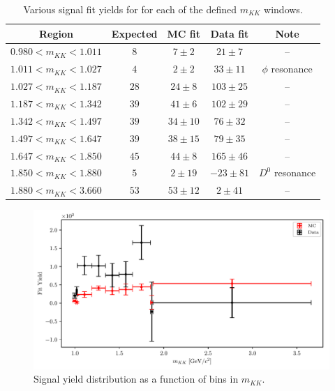 \begin{table}[H]
	\centering
	\begin{tabular}{c|c|c|c|c}
		Region & Expected & MC fit & Data fit & Note \\
		\toprule
		$0.980  < m_{KK} < 1.011$ & $8$ & $7 \pm 2$ & $21 \pm 7$ & --\\
		$1.011  < m_{KK} < 1.027$ & $4$ & $2 \pm 2$ & $33 \pm 11$ & $\phi$ resonance\\
		$1.027  < m_{KK} < 1.187$ & $28$ & $24 \pm 8$ & $103 \pm 25$ & --\\
		$1.187  < m_{KK} < 1.342$ & $39$ & $41 \pm 6$ & $102 \pm 29$ & --\\
		$1.342  < m_{KK} < 1.497$ & $39$ & $34 \pm 10$ & $76 \pm 32$ & --\\
		$1.497  < m_{KK} < 1.647$ & $39$ & $38 \pm 15$ & $79 \pm 35$ & --\\
		$1.647  < m_{KK} < 1.850$ & $45$ & $44 \pm 8$ & $165 \pm 46$ & --\\
		$1.850  < m_{KK} < 1.880$ & $5$ & $2 \pm 19$ & $-23 \pm 81$ & $D^0$ resonance\\
		$1.880  < m_{KK} < 3.660$ & $53$ & $53 \pm 12$ & $2 \pm 41$ & -- \\
		\bottomrule
	\end{tabular}
	\captionsetup{width=.8\linewidth}
	\caption{Various signal fit yields for for each of the defined $m_{KK}$ windows.}
	\label{tab:mKK_windows}
\end{table}

\begin{figure}[H]
	\centering
	\captionsetup{width=0.8\linewidth}
	\includegraphics[width=\linewidth]{fig/sig_mKK_all}
	\caption{Signal yield distribution as a function of bins in $m_{KK}$.}
	\label{fig:mKK_windows}
\end{figure} 
